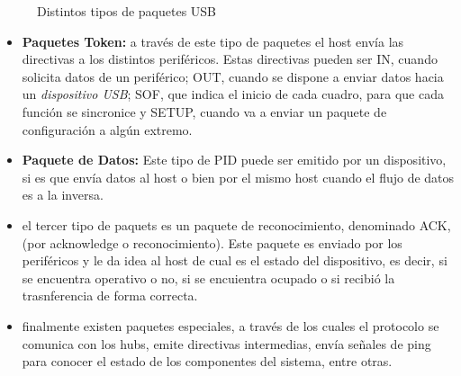 \begin{figure}
		\caption{Distintos tipos de paquetes USB}
		\label{fig:usbpkts}
	\end{figure}
	
	\begin{itemize}
		\item {\bf Paquetes Token:} a través de este tipo de paquetes el host envía las directivas a los distintos periféricos. Estas directivas pueden ser IN, cuando solicita datos de un periférico; OUT, cuando se dispone a enviar datos hacia un {\it dispositivo USB}; SOF, que indica el inicio de cada cuadro, para que cada función se sincronice y SETUP, cuando va a enviar un paquete de configuración a algún extremo.
		\item {\bf Paquete de Datos:} Este tipo de PID puede ser emitido por un dispositivo, si es que envía datos al host o bien por el mismo host cuando el flujo de datos es a la inversa.
		\item el tercer tipo de paquets es un paquete de reconocimiento, denominado ACK, (por acknowledge o reconocimiento). Este paquete es enviado por los periféricos y le da idea al host de cual es el estado del dispositivo, es decir, si se encuentra operativo o no, si se encuientra ocupado o si recibió la trasnferencia de forma correcta.
		\item finalmente existen paquetes especiales, a través de los cuales el protocolo se comunica con los hubs, emite directivas intermedias, envía señales de ping para conocer el estado de los componentes del sistema, entre otras.
	\end{itemize}
	
